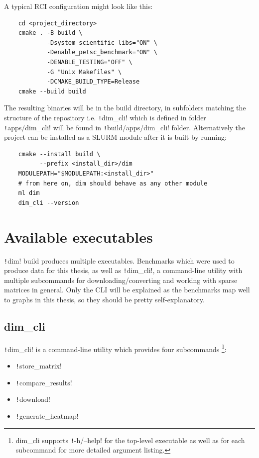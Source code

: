 \documentclass[thesis=M,english]{FITthesis}[2019/12/23]
\newcommand{\csre}[1]{\texttt!#1!}
\begin{document}
A typical RCI configuration might look like this:
\begin{verbatim}
    cd <project_directory>
    cmake . -B build \
            -Dsystem_scientific_libs="ON" \
            -Denable_petsc_benchmark="ON" \
            -DENABLE_TESTING="OFF" \
            -G "Unix Makefiles" \
            -DCMAKE_BUILD_TYPE=Release
    cmake --build build
\end{verbatim}

The resulting binaries will be in the build directory, in subfolders matching the structure of
the repository i.e. \csre{dim_cli} which is defined in folder \csre{apps/dim_cli} will be found
in \csre{build/apps/dim_cli} folder. Alternatively the project can be installed as a SLURM module
after it is built by running:

\begin{verbatim}
    cmake --install build \
          --prefix <install_dir>/dim
    MODULEPATH="$MODULEPATH:<install_dir>"
    # from here on, dim should behave as any other module
    ml dim
    dim_cli --version
\end{verbatim}

\section{Available executables}

\csre{dim} build produces multiple executables. Benchmarks which were used to produce data for this thesis, as
well as \csre{dim_cli}, a command-line utility with multiple subcommands for downloading/converting and
working with sparse matrices in general. Only the CLI will be explained as the benchmarks map well to
graphs in this thesis, so they should be pretty self-explanatory.

\subsection{dim\_cli}

\csre{dim_cli} is a command-line utility which provides four subcommands
\footnote{dim\_cli supports \csre{-h/--help} for the top-level executable as well as for each subcommand for more detailed argument listing.}:
\begin{itemize}
    \item \csre{store_matrix}
    \item \csre{compare_results}
    \item \csre{download}
    \item \csre{generate_heatmap}
\end{itemize}
\end{document}

